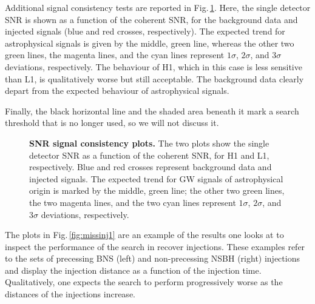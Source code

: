 \documentclass[binding=0.6cm, LaM]{sapthesis}
\begin{document}
	Additional signal consistency tests are reported in Fig.\,\ref{fig:detector1}. 
	Here, the single detector SNR is shown as a function of the coherent SNR, 
	for the background data and injected signals (blue and red crosses, respectively).
	The expected trend for astrophysical signals is given by the middle, green line, 
	whereas the other two green lines, the magenta lines, and the cyan lines represent $1\sigma$, $2\sigma$, 
	and $3\sigma$ deviations, respectively.
	The behaviour of H1, which in this case is less sensitive than L1, 
	is qualitatively worse but still acceptable.
	The background data clearly depart from the expected behaviour of astrophysical signals.
        
	Finally, the black horizontal line and the shaded area beneath it mark a search threshold 
	that is no longer used, so we will not discuss it.
        \begin{figure}[!t]
          \noindent
          \label{detector1}
          \centering
          \caption{\textbf{SNR signal consistency plots.} The two plots show the single detector SNR as a function of the coherent SNR, for H1 and L1, respectively.  Blue and red crosses represent background data and injected signals.  The expected trend for GW signals of astrophysical origin is marked by the middle, green line; the other two green lines, the two magenta lines, and the two cyan lines represent $1\sigma$, $2\sigma$, and $3\sigma$ deviations, respectively.}
          \label{fig:detector1}
        \end{figure}
	The plots in Fig.\,\ref{fig:missinj1} are an example of the results 
	one looks at to inspect the performance of the search in recover injections.
        These examples refer to the sets of precessing BNS (left) and non-precessing NSBH (right) 
	injections and display the injection distance as a function of the injection time.
	Qualitatively, one expects the search to perform progressively worse 
	as the distances of the injections increase. 
\end{document}
